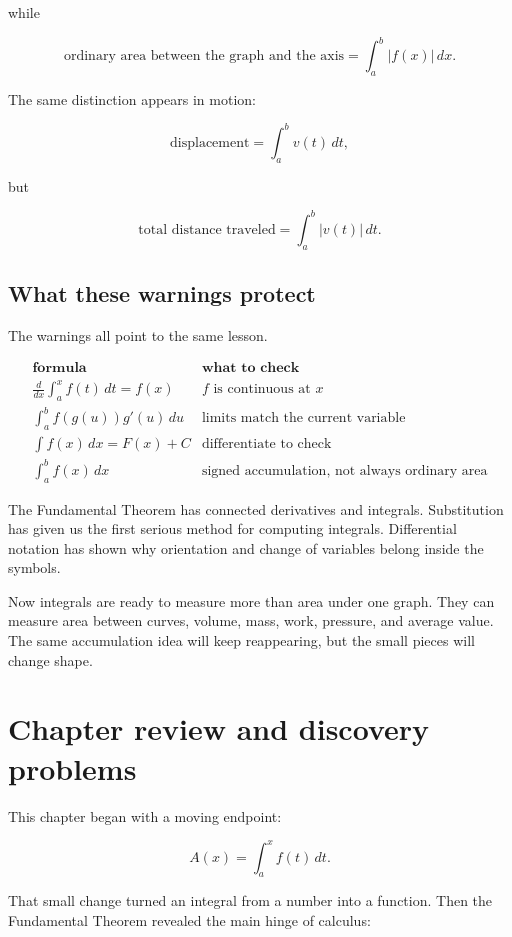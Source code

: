 while

\[
\boxed{
\text{ordinary area between the graph and the axis}
=
\int_a^b |f(x)|\,dx.
}
\]

The same distinction appears in motion:

\[
\text{displacement}=\int_a^b v(t)\,dt,
\]

but

\[
\text{total distance traveled}=\int_a^b |v(t)|\,dt.
\]

\subsection{What these warnings protect}
\label{subsec:what-warnings-protect-ftc}

The warnings all point to the same lesson.

\[
\begin{array}{c|c}
\textbf{formula} & \textbf{what to check} \\ \hline
\displaystyle \frac{d}{dx}\int_a^x f(t)\,dt=f(x)
& f\text{ is continuous at }x \\[12pt]
\displaystyle \int_a^b f(g(u))g'(u)\,du
& \text{limits match the current variable} \\[12pt]
\displaystyle \int f(x)\,dx=F(x)+C
& \text{differentiate to check} \\[12pt]
\displaystyle \int_a^b f(x)\,dx
& \text{signed accumulation, not always ordinary area}
\end{array}
\]

The Fundamental Theorem has connected derivatives and integrals.  Substitution has
given us the first serious method for computing integrals.  Differential notation has
shown why orientation and change of variables belong inside the symbols.

Now integrals are ready to measure more than area under one graph.  They can measure
area between curves, volume, mass, work, pressure, and average value.  The same
accumulation idea will keep reappearing, but the small pieces will change shape.
\section{Chapter review and discovery problems}
\label{sec:chapter9-review-discovery}

This chapter began with a moving endpoint:

\[
A(x)=\int_a^x f(t)\,dt.
\]

That small change turned an integral from a number into a function.  Then the
Fundamental Theorem revealed the main hinge of calculus:

